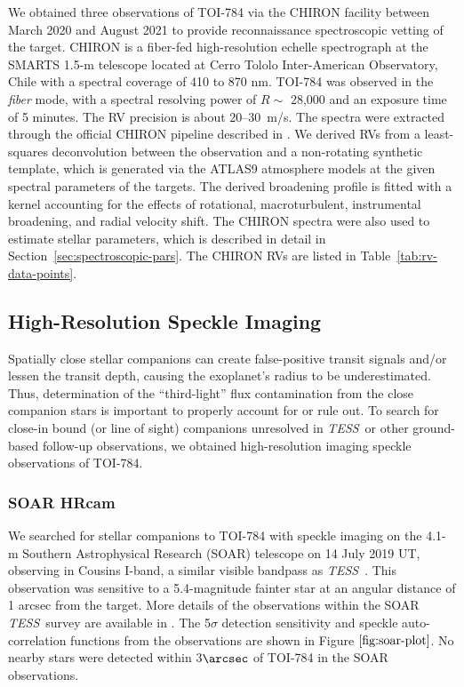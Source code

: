 \documentclass[twocolumn]{aastex631}
\newcommand{\tess}{\textit{TESS}\ }
\begin{document}
We obtained three observations of TOI-784 via the CHIRON facility between March 2020 and August 2021 to provide reconnaissance spectroscopic vetting of the target. CHIRON is a fiber-fed high-resolution echelle spectrograph at the SMARTS 1.5-m telescope located at Cerro Tololo Inter-American Observatory, Chile \citep{Tokovinin2013} with a spectral coverage of 410 to 870 nm. TOI-784 was observed in the \emph{fiber} mode, with a spectral resolving power of $R\sim$ 28,000 and an exposure time of 5 minutes. The RV precision is about 20--30~m/s.
The spectra were extracted through the official CHIRON pipeline described in \citet{Paredes2021}. We derived RVs from a least-squares deconvolution between the observation and a non-rotating synthetic template, which is generated via the ATLAS9 atmosphere models \citep{Kurucz2004} at the given spectral parameters of the targets. The derived broadening profile is fitted with a kernel accounting for the effects of rotational, macroturbulent, instrumental broadening, and radial velocity shift. The CHIRON spectra were also used to estimate stellar parameters, which is described in detail in Section~\ref{sec:spectroscopic-pars}. The CHIRON RVs are listed in Table~\ref{tab:rv-data-points}.


\subsection{High-Resolution Speckle Imaging}
\label{sec:direct-imaging}

Spatially close stellar companions can create false-positive transit signals and/or lessen the transit depth, causing the exoplanet's radius to be underestimated. Thus, determination of the ``third-light” flux contamination from the close companion stars is important to properly account for or rule out. To search for close-in bound (or line of sight) companions unresolved in \tess or other ground-based follow-up observations, we obtained high-resolution imaging speckle observations of TOI-784.

\subsubsection{SOAR HRcam}
\label{sec:soar}

We searched for stellar companions to TOI-784 with speckle imaging on the 4.1-m Southern Astrophysical Research (SOAR) telescope \citep{Tokovinin:2018} on 14 July 2019 UT, observing in Cousins I-band, a similar visible bandpass as \tess. This observation was sensitive to a 5.4-magnitude fainter star at an angular distance of 1 arcsec from the target. More details of the observations within the SOAR \tess survey are available in \citet{Ziegler:2020}. The 5$\sigma$ detection sensitivity and speckle auto-correlation functions from the observations are shown in Figure $\ref{fig:soar-plot}$. No nearby stars were detected within 3$\arcsec$ of TOI-784 in the SOAR observations.
\end{document}
